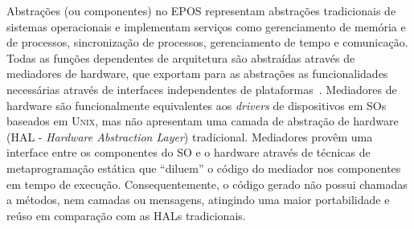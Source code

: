 \documentclass[11pt,twocolumn]{article}
\newcommand{\fig}[4][ht!]{
  \begin{figure}[#1]
    {\centering{\texttt{[image: fig/\#2]}}\par}
    \caption{#3}
    \label{fig:#2}
  \end{figure}
}
\begin{document}



Abstrações (ou componentes) no \textsc{EPOS} representam abstrações tradicionais de sistemas operacionais e implementam serviços como gerenciamento de memória e de processos, sincronização de processos, gerenciamento de tempo e comunicação. Todas as funções dependentes de arquitetura são abstraídas através de mediadores de hardware, que exportam para as abstrações as funcionalidades necessárias através de interfaces independentes de plataformas~\cite{Polpeta2004}. Mediadores de hardware são funcionalmente equivalentes aos \emph{drivers} de dispositivos em SOs baseados em \textsc{Unix}, mas não apresentam uma camada de abstração de hardware (HAL - \emph{Hardware Abstraction Layer}) tradicional. Mediadores provêm uma interface entre os componentes do SO e o hardware através de técnicas de metaprogramação estática que ``diluem'' o código do mediador nos componentes em tempo de execução. Consequentemente, o código gerado não possui chamadas a métodos, nem camadas ou mensagens, atingindo uma maior portabilidade e reúso em comparação com as HALs tradicionais.
\end{document}
